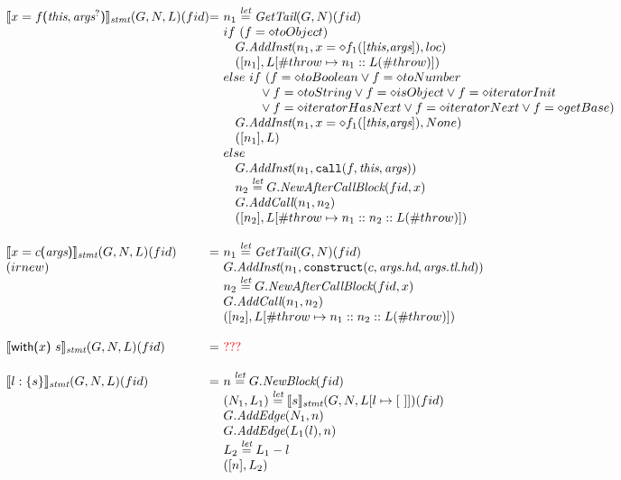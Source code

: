 \[
\begin{array}{l@{}l@{~}l}
\transfun{\ircall{x}{f}{\emph{this}, \emph{args}^{?}}}_{\emph{stmt}}(G,N,L)(fid) & = &
	n_1 \letval \GetTail(G,N)(fid)\\
	& & if\ (f = \diamond{toObject}) \\
	& & \phantom{if} G.\emph{AddInst}(n_1,x =\diamond f_1([\emph{this,args}]), loc)\\
	& & \phantom{if} ([n_1],L[\#throw \mapsto n_{1}::L(\#throw)])\\
	& & else\ if\ (f = \diamond{toBoolean} \vee f = \diamond{toNumber}\\
	& & \phantom{ififif} \vee f = \diamond{toString} \vee f = \diamond{isObject}\vee f = \diamond{iteratorInit}\\
	& & \phantom{ififif} \vee f = \diamond{iteratorHasNext}\vee f = \diamond{iteratorNext}\vee f = \diamond{getBase})\\
	& & \phantom{if} G.\emph{AddInst}(n_1,x =\diamond f_1([\emph{this,args}]), None)\\
	& & \phantom{if} ([n_1],L)\\
	& & else\\
	& & \phantom{if} G.\emph{AddInst}(n_1,\TT{call}(f,\emph{this},\emph{args}))\\
	& & \phantom{if} n_2 \letval G.\emph{NewAfterCallBlock}(fid,x)\\
	& & \phantom{if} G.\emph{AddCall}(n_1, n_2) \\
	& & \phantom{if} ([n_2],L[\# throw \mapsto n_1::n_2::L(\# throw)])\\
	& & \\
	
\transfun{\irnew{x}{c}{\emph{args}}}_{\emph{stmt}}(G,N,L)(fid) & = &
	n_1 \letval \GetTail(G,N)(fid)\\
(irnew)
	& & G.\emph{AddInst}(n_1,\TT{construct}(c,\emph{args.hd},\emph{args.tl.hd}))\\
	& & n_2 \letval G.\emph{NewAfterCallBlock}(fid,x)\\
	& & G.\emph{AddCall}(n_1, n_2) \\
	& & ([n_2],L[\# throw \mapsto n_1::n_2::L(\# throw)])\\
	& & \\
	
\transfun{\irwith{x}{s}}_{\emph{stmt}}(G,N,L)(fid) & = &
	{\inred ???} \\
	& & \\

\transfun{\irlabel{l}{s}}_{\emph{stmt}}(G,N,L)(fid) & = &
	n \letval G.\emph{NewBlock}(fid)\\\
	& & (N_1,L_1) \letval \transfun{s}_{\emph{stmt}}(G,N,L[l\mapsto[\ ]])(fid)\\
	& & G.\emph{AddEdge}(N_1,n)\\
	& & G.\emph{AddEdge}(L_1(l),n)\\
	& & L_2 \letval L_1 - l\\
	& & ([n],L_2 ) \\
	& & \\


\end{array}\]
